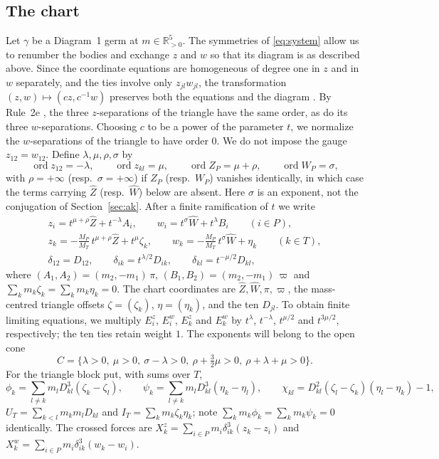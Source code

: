 \documentclass[11pt]{amsart}
\theoremstyle{definition}
\theoremstyle{remark}
\newcommand{\Rp}{\mathbb{R}_{>0}}
\newcommand{\ord}{\operatorname{ord}}
\begin{document}
\subsection{The chart}
{Let $\gamma$ be a Diagram~1 germ at $m\in\Rp^5$.  The symmetries of
\eqref{eq:system} allow us to renumber the bodies and exchange $z$ and $w$ so that its
diagram is as described above.  Since the coordinate equations are homogeneous of degree
one in $z$ and in $w$ separately, and the ties involve only $z_{jl}w_{jl}$, the transformation
$(z,w)\mapsto(cz,c^{-1}w)$ preserves both the equations and the diagram
\cite[p.~547]{AK}.
By Rule~2e \cite[p.~552]{AK}, the three $z$-separations of the triangle have the same order,
as do its three $w$-separations.  Choosing $c$ to be a power of the parameter $t$, we normalize
the $w$-separations of the triangle to have order $0$.  We do not impose the gauge
$z_{12}=w_{12}$.  Define $\lambda,\mu,\rho,\sigma$ by}
\[
  \ord z_{12}=-\lambda,\qquad \ord z_{kl}=\mu,\qquad \ord Z_P=\mu+\rho,\qquad \ord W_P=\sigma,
\]
with $\rho=+\infty$ (resp.\ $\sigma=+\infty$) if $Z_P$ (resp.\ $W_P$) vanishes identically, in
which case the terms carrying $\hat Z$ (resp.\ $\hat W$) below are absent.  Here $\sigma$ is an
exponent, not the conjugation of Section~\ref{sec:ak}.
After a finite ramification of $t$ we write
\begin{equation}\label{eq:d1-chart}
\begin{gathered}
  z_i=t^{\mu+\rho}\hat Z+t^{-\lambda}A_i,\qquad w_i=t^{\sigma}\hat W+t^{\lambda}B_i
  \qquad(i\in P),\\
  z_k=-\tfrac{M_P}{M_T}\,t^{\mu+\rho}\hat Z+t^{\mu}\zeta_k,\qquad
  w_k=-\tfrac{M_P}{M_T}\,t^{\sigma}\hat W+\eta_k\qquad(k\in T),\\
  \delta_{12}=D_{12},\qquad\delta_{ik}=t^{\lambda/2}D_{ik},\qquad\delta_{kl}=t^{-\mu/2}D_{kl},
\end{gathered}
\end{equation}
where $(A_1,A_2)=(m_2,-m_1)\,\pi$, $(B_1,B_2)=(m_2,-m_1)\,\varpi$ and
$\sum_km_k\zeta_k=\sum_km_k\eta_k=0$.  {The chart coordinates are
$\hat Z,\hat W,\pi,\varpi$, the mass-centred triangle offsets $\zeta=(\zeta_k)$,
$\eta=(\eta_k)$, and the ten $D_{jl}$.  To obtain finite limiting equations, we multiply
$E^z_i$, $E^w_i$, $E^z_k$ and $E^w_k$ by $t^{\lambda}$, $t^{-\lambda}$, $t^{\mu/2}$ and
$t^{3\mu/2}$, respectively; the ten ties retain weight $1$.
The exponents will belong to the open cone}
\begin{equation}\label{eq:d1-cone}
  C=\{\lambda>0,\ \mu>0,\ \sigma-\lambda>0,\ \rho+\tfrac32\mu>0,\ \rho+\lambda+\mu>0\}.
\end{equation}
For the triangle block put, with sums over $T$,
\[
  \phi_k=\sum_{l\ne k}m_lD_{kl}^3(\zeta_k-\zeta_l),\qquad
  \psi_k=\sum_{l\ne k}m_lD_{kl}^3(\eta_k-\eta_l),\qquad
  \chi_{kl}=D_{kl}^2(\zeta_l-\zeta_k)(\eta_l-\eta_k)-1,
\]
$U_T=\sum_{k<l}m_km_lD_{kl}$ and $I_T=\sum_km_k\zeta_k\eta_k$; note
$\sum_km_k\phi_k=\sum_km_k\psi_k=0$ identically.  The crossed forces are
$X^z_k=\sum_{i\in P}m_i\delta_{ik}^3(z_k-z_i)$ and $X^w_k=\sum_{i\in P}m_i\delta_{ik}^3(w_k-w_i)$.
\end{document}
